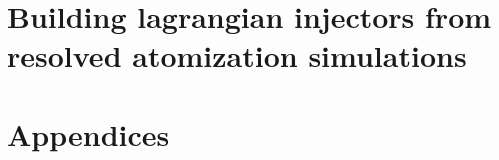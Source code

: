 \documentclass[twoside]{report}
\begin{document}
\part{Building lagrangian injectors from resolved atomization simulations}

\newpage 

\newpage
%
%
%
%
%
%


\fancyhead[LO]{}
\nocite{*}




\part{Appendices}
\begin{appendices}

\newpage

\newpage

\newpage

\newpage

\newpage

\newpage

\newpage
\end{appendices}
\end{document}
